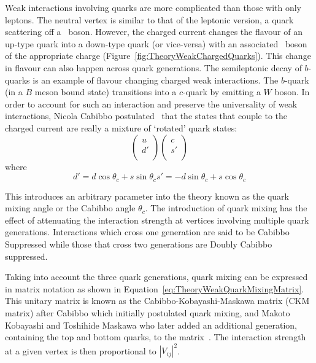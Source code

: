 Weak interactions involving quarks are more complicated than those with only leptons. The neutral vertex is similar to that of the leptonic version, a quark scattering off a \Z\ boson. However, the charged current changes the flavour of an up-type quark into a down-type quark (or vice-versa) with an associated \W\ boson of the appropriate charge (Figure~\ref{fig:TheoryWeakChargedQuarks}). This change in flavour can also happen across quark generations. The semileptonic decay of $b$-quarks is an example of flavour changing charged weak interactions. The $b$-quark (in a $B$ meson bound state) transitions into a $c$-quark by emitting a $W$ boson. In order to account for such an interaction and preserve the universality of weak interactions, Nicola Cabibbo postulated~\cite{Theory:CKMNicola} that the states that couple to the charged current are really a mixture of `rotated' quark states:
%
\begin{equation}
  \begin{pmatrix}
    u \\
    d' \\
  \end{pmatrix}
  \begin{pmatrix}
    c \\
    s' \\
  \end{pmatrix}
\end{equation}
%
where
%
\begin{subequations}
  \begin{equation}
  \label{eq:TheoryWeakQuarkMixingEq1}
  d'=d\cos\theta_{c} + s\sin\theta_{c}
  \end{equation}
  \begin{equation}
  \label{eq:TheoryWeakQuarkMixingEq2}
  s'=-d\sin\theta_{c} + s\cos\theta_{c}
  \end{equation}
\end{subequations}

This introduces an arbitrary parameter into the theory known as the quark mixing angle or the Cabibbo angle $\theta_{c}$. The introduction of quark mixing has the effect of attenuating the interaction strength at vertices involving multiple quark generations. Interactions which cross one generation are said to be Cabibbo Suppressed while those that cross two generations are Doubly Cabibbo suppressed.

Taking into account the three quark generations, quark mixing can be expressed in matrix notation as shown in Equation~\ref{eq:TheoryWeakQuarkMixingMatrix}. This unitary matrix is known as the Cabibbo-Kobayashi-Maskawa matrix (CKM matrix) after Cabibbo which initially postulated quark mixing, and Makoto Kobayashi and Toshihide Maskawa who later added an additional generation, containing the top and bottom quarks, to the matrix~\cite{Theory:CKMKobayashiMaskawa}. The interaction strength at a given vertex is then proportional to $|V_{ij}|^{2}$.

